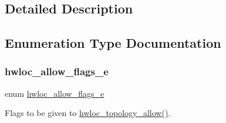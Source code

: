 \subsection{Detailed Description}


\subsection{Enumeration Type Documentation}
\mbox{\label{a00194_ga38b1be3922094d880f6e76bf56c973d6}} 
\subsubsection{\texorpdfstring{hwloc\+\_\+allow\+\_\+flags\+\_\+e}{hwloc\_allow\_flags\_e}}
{\footnotesize\ttfamily enum \hyperlink{a00194_ga38b1be3922094d880f6e76bf56c973d6}{hwloc\+\_\+allow\+\_\+flags\+\_\+e}}



Flags to be given to \hyperlink{a00194_gaf955b190c0299dcfb5bc985d777f92a1}{hwloc\+\_\+topology\+\_\+allow()}. 

